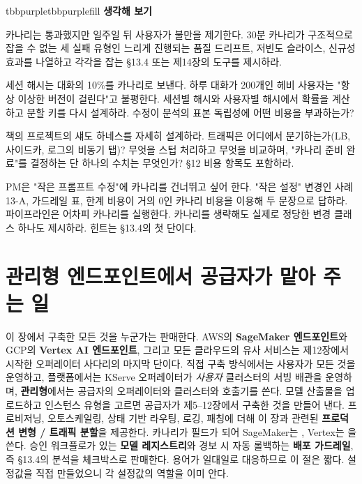 \begin{calloutbox}{tbbpurple}{tbbpurplefill}
{\normalsize\bfseries\color{tbbpurple}생각해 보기}\par\vspace{3pt}
\begin{tbbitemize}
  \item 카나리는 통과했지만 일주일 뒤 사용자가 불만을 제기한다. 30분 카나리가 구조적으로 잡을 수 없는 세 실패 유형인 느리게 진행되는 품질 드리프트, 저빈도 슬라이스, 신규성 효과를 나열하고 각각을 잡는 §13.4 또는 제14장의 도구를 제시하라.
  \item 세션 해시는 대화의 10\%를 카나리로 보낸다. 하루 대화가 200개인 헤비 사용자는 "항상 이상한 버전이 걸린다"고 불평한다. 세션별 해시와 사용자별 해시에서 확률을 계산하고 분할 키를 다시 설계하라. 수정이 분석의 표본 독립성에 어떤 비용을 부과하는가?
  \item 책의 프로젝트의 섀도 하네스를 자세히 설계하라. 트래픽은 어디에서 분기하는가(LB, 사이드카, 로그의 비동기 탭)? 무엇을 스텁 처리하고 무엇을 비교하며, "카나리 준비 완료"를 결정하는 단 하나의 수치는 무엇인가? §12 비용 항목도 포함하라.
  \item PM은 "작은 프롬프트 수정"에 카나리를 건너뛰고 싶어 한다. "작은 설정" 변경인 사례 13-A, 가드레일 표, 한계 비용이 거의 0인 카나리 비용을 이용해 두 문장으로 답하라. 파이프라인은 어차피 카나리를 실행한다. 카나리를 생략해도 실제로 정당한 변경 클래스 하나도 제시하라. 힌트는 §13.4의 첫 단이다.
\end{tbbitemize}
\end{calloutbox}

\section{관리형 엔드포인트에서 공급자가 맡아 주는 일}

이 장에서 구축한 모든 것을 누군가는 판매한다. AWS의 \textbf{SageMaker 엔드포인트}와 GCP의 \textbf{Vertex AI 엔드포인트}, 그리고 모든 클라우드의 유사 서비스는 제12장에서 시작한 오퍼레이터 사다리의 마지막 단이다. 직접 구축 방식에서는 사용자가 모든 것을 운영하고, 플랫폼에서는 KServe 오퍼레이터가 \textit{사용자} 클러스터의 서빙 배관을 운영하며, \textbf{관리형}에서는 공급자의 오퍼레이터와 클러스터와 호출기를 쓴다. 모델 산출물을 업로드하고 인스턴스 유형을 고르면 공급자가 제5–12장에서 구축한 것을 만들어 낸다. 프로비저닝, 오토스케일링, 상태 기반 라우팅, 로깅, 패칭에 더해 이 장과 관련된 \textbf{프로덕션 변형 / 트래픽 분할}을 제공한다. 카나리가 필드가 되어 SageMaker는 , Vertex는 을 쓴다. 승인 워크플로가 있는 \textbf{모델 레지스트리}와 경보 시 자동 롤백하는 \textbf{배포 가드레일}, 즉 §13.4의 분석을 체크박스로 판매한다. 용어가 일대일로 대응하므로 이 절은 짧다. 설정값을 직접 만들었으니 각 설정값의 역할을 이미 안다.

